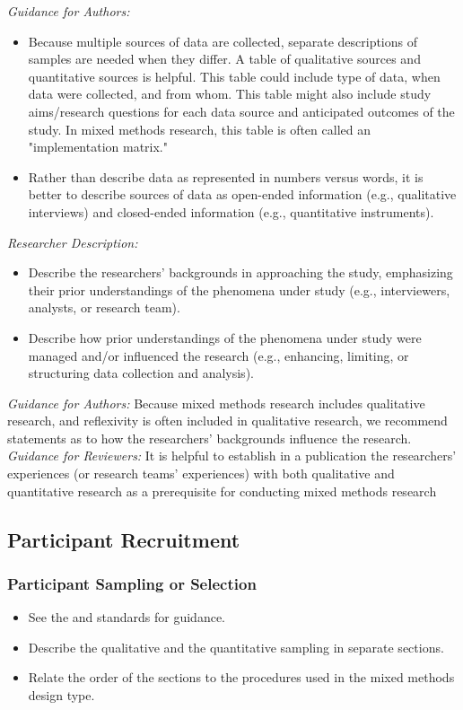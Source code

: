 \documentclass[acmsmall]{acmart}
\begin{document}
\textit{Guidance for Authors:}
\begin{itemize}
\item Because multiple sources of data are collected, separate descriptions of samples are needed when they differ. A table of qualitative sources and quantitative sources is helpful. This table could include type of data, when data were collected, and from whom. This table might also include study aims/research questions for each data source and anticipated outcomes of the study. In mixed methods research, this table is often called an "implementation matrix."
\item Rather than describe data as represented in numbers versus words, it is better to describe sources of data as open-ended information (e.g., qualitative interviews) and closed-ended information (e.g., quantitative instruments).
\end{itemize}

\textit{Researcher Description:}
\begin{itemize}
\item Describe the researchers’ backgrounds in approaching the study, emphasizing their prior understandings of the phenomena under study (e.g., interviewers, analysts, or research team).
\item Describe how prior understandings of the phenomena under study were managed and/or influenced the research (e.g., enhancing, limiting, or structuring data collection and analysis).
\end{itemize}

\textit{Guidance for Authors: }
Because mixed methods research includes qualitative research, and reflexivity is often included in qualitative research, we recommend statements as to how the researchers’ backgrounds influence the research.
\textit{Guidance for Reviewers:}
It is helpful to establish in a publication the researchers’ experiences (or research teams’ experiences) with both qualitative and quantitative research as a prerequisite for conducting mixed methods research




\subsection{Participant Recruitment}

\subsubsection{Participant Sampling or Selection}
\begin{itemize}
\item See the \hyperlink{https://apastyle.apa.org/jars/quantitative}{\color{blue}{JARS-QUANT}} and \hyperlink{https://apastyle.apa.org/jars/qualitative}{\color{blue}{JARS-QUAL}} standards for guidance.
\item Describe the qualitative and the quantitative sampling in separate sections.
\item Relate the order of the sections to the procedures used in the mixed methods design type.
\end{itemize}
\end{document}
